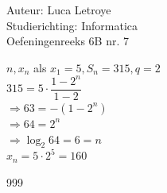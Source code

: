 \documentclass[a4paper]{article}
\begin{document}
  
\noindent \large Auteur: Luca Letroye \\
\noindent \large Studierichting: Informatica\\
\noindent \large Oefeningenreeks 6B nr. 7\\

\medskip
\normalsize

$n,x_n$ als $x_1 = 5, S_n = 315, q = 2$\\

$315 = 5\cdot \dfrac{1-2^n}{1-2}$\\

$\Rightarrow 63 = -(1-2^n)$\\

$\Rightarrow 64 = 2^n$\\

$\Rightarrow \log_2 64 = 6 = n$\\

$x_n = 5\cdot 2^5 = 160$\\






\begin{thebibliography}{999}
\end{thebibliography}
\end{document}
